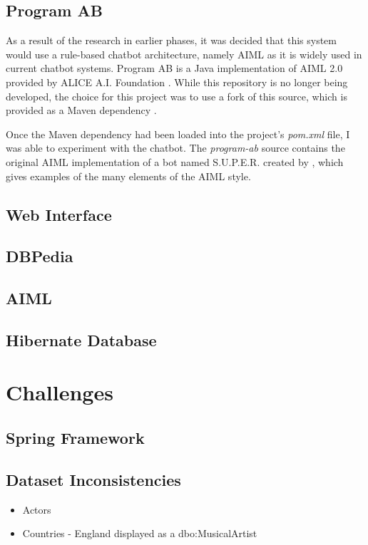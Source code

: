 \subsection{Program AB}
As a result of the research in earlier phases, it was decided that this system would use a rule-based chatbot architecture, namely AIML as it is widely used in current chatbot systems. Program AB is a Java implementation of AIML 2.0 provided by ALICE A.I. Foundation \cite{programab_2013}. While this repository is no longer being developed, the choice for this project was to use a fork of this source, which is provided as a Maven dependency \cite{lumenrobot2016}.

Once the Maven dependency had been loaded into the project's {\it{pom.xml}} file, I was able to experiment with the chatbot. The {\it{program-ab}} source contains the original AIML implementation of a bot named S.U.P.E.R. created by \citeauthor{wallace2009anatomy}, which gives examples of the many elements of the AIML style.


\subsection{Web Interface}

\subsection{DBPedia}

\subsection{AIML}

\subsection{Hibernate Database}



\section{Challenges}
\subsection{Spring Framework}

\subsection{Dataset Inconsistencies}
\begin{itemize}
	\item Actors 
	\item Countries - England displayed as a dbo:MusicalArtist
\end{itemize}

